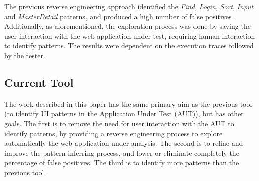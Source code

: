 \documentclass[10pt, conference, compsocconf]{IEEEtran}
\begin{document}
\begin{table}[!htb]
\caption{Example of an execution trace file.}
\label{tab:exec}
\end{table}

The previous reverse engineering approach identified the \textit{Find}, \textit{Login}, \textit{Sort}, \textit{Input} and \textit{MasterDetail} patterns, and produced a high number of false positives \cite{nabuco2013inferring}. Additionally, as aforementioned, the exploration process was done by saving the user interaction with the web application under test, requiring human interaction to identify patterns. The results were dependent on the execution traces followed by the tester. 

\subsection{Current Tool}

The work described in this paper has the same primary aim as the previous tool (to identify UI patterns in the Application Under Test (AUT)), but has other goals. The first is to remove the need for user interaction with the AUT to identify patterns, by providing a reverse engineering process to explore automatically the web application under analysis. The second is to refine and improve the pattern inferring process, and lower or eliminate completely the percentage of false positives. The third is to identify more patterns than the previous tool.
\end{document}
